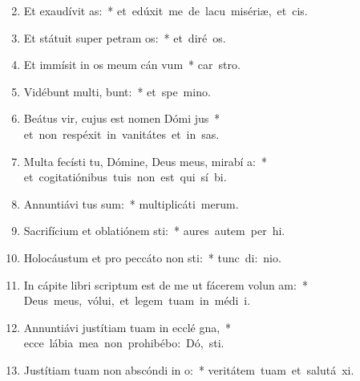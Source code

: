 \begin{flushleft}
\begin{enumerate}[leftmargin=*]
\setcounter{enumi}{1}

\item Et exaudívit  as:~* \mbox{et edúxit me de lacu misériæ, et   cis.}
\item Et státuit super petram  os:~* \mbox{et diré  os.}
\item Et immísit in os meum cán vum~* \mbox{car  stro.}
\item Vidébunt multi,  bunt:~* \mbox{et spe  mino.}
\item Beátus vir, cujus est nomen Dómi  jus~* \mbox{et non respéxit in vanitátes et in sas.}
\item Multa fecísti tu, Dómine, Deus meus, mirabí a:~* \mbox{et cogitatiónibus tuis non est qui sí  bi.}
\item Annuntiávi  tus sum:~* \mbox{multiplicáti   merum.}
\item Sacrifícium et oblatiónem sti:~* \mbox{aures autem per hi.}
\item Holocáustum et pro peccáto non sti:~* \mbox{tunc di:  nio.}
\item In cápite libri scriptum est de me ut fácerem volun am:~* \mbox{Deus meus, vólui, et legem tuam in médi  i.}
\item Annuntiávi justítiam tuam in ecclé gna,~* \mbox{ecce lábia mea non prohibébo: Dó,  sti.}
\item Justítiam tuam non abscóndi in  o:~* \mbox{veritátem tuam et salutá  xi.}

\end{enumerate}
\end{flushleft}
